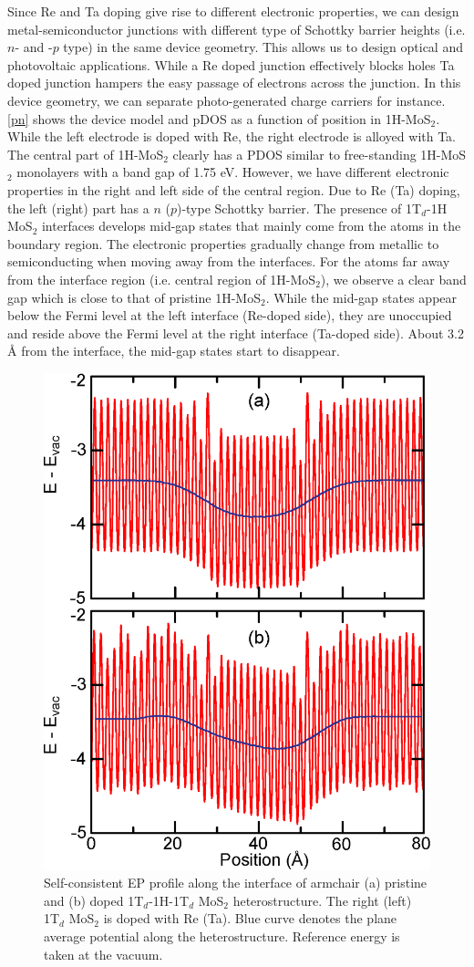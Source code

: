 Since Re and Ta doping give rise to different electronic properties, we can design metal-semiconductor
junctions with different type of Schottky barrier heights (i.e. $n$- and -$p$ type) in the same device geometry. This allows us to design 
optical and photovoltaic applications. While a Re doped junction effectively blocks holes Ta doped junction hampers the easy passage of electrons across the junction. In this device geometry, we can separate  photo-generated charge carriers for instance. \autoref{pn} shows the device model and pDOS as a function of position in 1H-MoS$_2$. While the left electrode is doped with Re, the right electrode is alloyed with Ta.  The central part of 1H-MoS$_2$ clearly has a PDOS similar to free-standing 1H-MoS$_2$ monolayers with a band gap of 1.75 eV.  However, we have different electronic properties in the right and left side of the central region.
Due to Re (Ta) doping, the left (right) part has a $n$ ($p$)-type Schottky barrier.  
The presence of 1T$_d$-1H MoS$_2$ interfaces develops mid-gap states that mainly come from the atoms in the
boundary region. The electronic properties gradually change from metallic to semiconducting when moving away from the interfaces.  For the atoms far away from the interface region (i.e. central region of 1H-MoS$_2$), we observe a clear band gap which is close to that of pristine 1H-MoS$_2$. While the mid-gap states appear below the Fermi level at the left interface (Re-doped side), they are unoccupied and reside above the Fermi level at the right interface (Ta-doped side).  About 3.2 {\AA} from the interface, the mid-gap states start to disappear.  

\begin{figure}[htb]
\centering
\includegraphics[width=0.6\linewidth]{potential.eps}
\caption{\label{potential}Self-consistent EP profile along the interface of armchair (a) pristine and (b) doped 1T$_d$-1H-1T$_d$ MoS$_2$ heterostructure.  The right (left) 1T$_d$ MoS$_2$ is doped with Re (Ta). Blue curve denotes the plane average potential along the heterostructure. Reference energy is taken at the vacuum.}
\end{figure}

